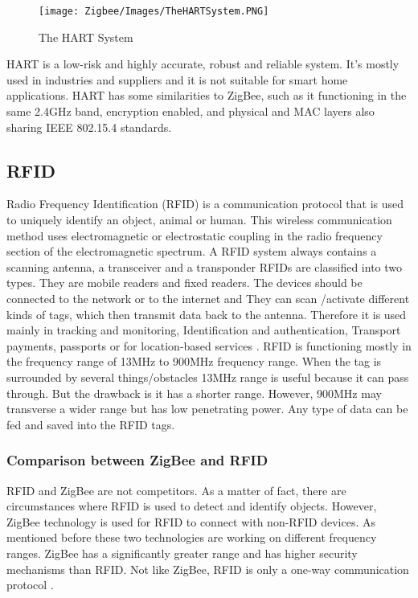 \documentclass[conference]{IEEEtran}
\begin{document}
 \begin{figure}[htbp]
    \centering
    \texttt{[image: Zigbee/Images/TheHARTSystem.PNG]}
    \caption{The HART System \cite{WangJiangZhang2023}}
    \label{fig:TheHARTSystem}
\end{figure}

HART is a low-risk and highly accurate, robust and reliable system.  It's mostly used in industries and suppliers and it is not suitable for smart home applications. HART has some similarities to ZigBee, such as it functioning in the same 2.4GHz band, encryption enabled, and physical and MAC layers also sharing IEEE 802.15.4 standards. \cite{Instrumentation_Tools}

\subsection{RFID}

Radio Frequency Identification (RFID) is a communication protocol that is used to uniquely identify an object, animal or human. This wireless communication method uses electromagnetic or electrostatic coupling in the radio frequency section of the electromagnetic spectrum. \cite{TechTarget2023}
A RFID system always contains a scanning antenna, a transceiver and a transponder RFIDs are classified into two types. They are mobile readers and fixed readers. The devices should be connected to the network or to the internet and They can scan /activate different kinds of tags, which then transmit data back to the antenna.\cite{TechTarget2023} Therefore it is used mainly in tracking and monitoring, Identification and authentication, Transport payments, passports or for location-based services \cite{WangJiangZhang2023}. 
RFID is functioning mostly in the frequency range of 13MHz to 900MHz frequency range. When the tag is surrounded by several things/obstacles 13MHz range is useful because it can pass through. But the drawback is it has a shorter range. However, 900MHz may transverse a wider range but has low penetrating power. Any type of data can be fed and saved into the RFID tags.  \cite{WangJiangZhang2023}
\subsubsection{Comparison between ZigBee and RFID}
RFID and ZigBee are not competitors. As a matter of fact, there are circumstances where RFID is used to detect and identify objects. However, ZigBee technology is used for RFID to connect with non-RFID devices. As mentioned before these two technologies are working on different frequency ranges. ZigBee has a significantly greater range and has higher security mechanisms than RFID. Not like ZigBee, RFID is only a one-way communication protocol\cite{WangJiangZhang2023} .
\end{document}
